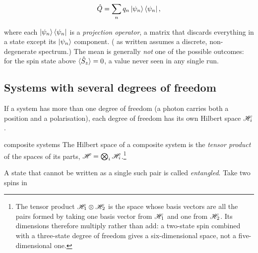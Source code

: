         \begin{equation}\label{eq:spectral}
            \hat{Q} = \sum_{n}q_{n}\ket{\psi_{n}}\bra{\psi_{n}},
        \end{equation}

        where each $\ket{\psi_{n}}\bra{\psi_{n}}$ is a \emph{projection operator}, a matrix that discards everything in a state except its $\ket{\psi_{n}}$ component. ( as written assumes a discrete, non-degenerate spectrum.) The mean is generally \emph{not} one of the possible outcomes: for the spin state above $\langle \hat{S}_{z} \rangle = 0$, a value never seen in any single run.

    \subsection{Systems with several degrees of freedom}

        If a system has more than one degree of freedom (a photon carries both a position and a polarisation), each degree of freedom has its own Hilbert space $\mathscr{H}_{i}$.

        \begin{postulate}{composite systems}
            \label{post:composite}
            The Hilbert space of a composite system is the \emph{tensor product} of the spaces of its parts, $\mathscr{H} = \bigotimes_{i}\mathscr{H}_{i}$.\footnote{The tensor product $\mathscr{H}_{1} \otimes \mathscr{H}_{2}$ is the space whose basis vectors are all the pairs formed by taking one basis vector from $\mathscr{H}_{1}$ and one from $\mathscr{H}_{2}$. Its dimensions therefore multiply rather than add: a two-state spin combined with a three-state degree of freedom gives a six-dimensional space, not a five-dimensional one.}
        \end{postulate}

        A state that cannot be written as a single such pair is called \emph{entangled}. Take two spins in

